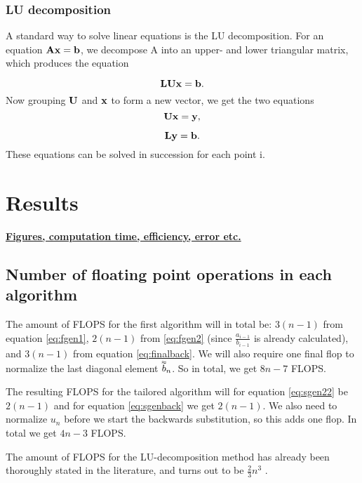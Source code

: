 \documentclass{emulateapj}
\newcommand{\dbtilde}[1]{\accentset{\approx}{#1}}
\begin{document}
\subsubsection{LU decomposition}
A standard way to solve linear equations is the LU decomposition. For an equation $\bold{A}\bold{x} = \bold{b}$, we decompose A into an upper- and lower triangular matrix, which produces the equation

\begin{equation} \label{eq:LU1}
    \bold{L}\bold{U} \bold{x} = \bold{b}.
\end{equation}
Now grouping $\bold{U}$ and $\bold{x}$ to form a new vector, we get the two equations
\begin{equation} \label{eq:LU2}
    \bold{U}\bold{x} = \bold{y},
\end{equation}

\begin{equation} \label{eq:LU2}
    \bold{L}\bold{y} = \bold{b}.
\end{equation}
These equations can be solved in succession for each point i.

\section{Results}
\label{sec:results}

\underline{\textbf{Figures, computation time, efficiency, error etc.}}
\subsection{Number of floating point operations in each algorithm}

The amount of FLOPS for the first algorithm will in total be: $3\left(n-1\right)$ from equation \ref{eq:fgen1}, $2\left(n-1\right)$ from \ref{eq:fgen2} (since $\frac{a_{i-1}}{b_{i-1}}$ is already calculated), and $3\left(n-1\right)$ from equation \ref{eq:finalback}. We will also require one final flop to normalize the last diagonal element $\dbtilde{b}_n$. So in total, we get $8n - 7$ FLOPS.

The resulting FLOPS for the tailored algorithm will for equation \ref{eq:sgen22} be $2\left(n-1\right)$ and for equation \ref{eq:sgenback} we get $2\left(n-1\right)$. We also need to normalize $u_n$ before we start the backwards substitution, so this adds one flop. In total we get $4n-3$ FLOPS.

The amount of FLOPS for the LU-decomposition method has already been thoroughly stated in the literature, and turns out to be $\frac{2}{3}n^3$ \cite{MHJ}.
\end{document}
